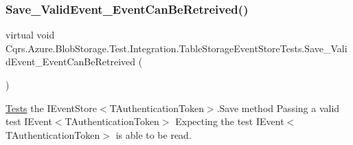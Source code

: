 \subsubsection{\texorpdfstring{Save\+\_\+\+Valid\+Event\+\_\+\+Event\+Can\+Be\+Retreived()}{Save\_ValidEvent\_EventCanBeRetreived()}}
{\footnotesize\ttfamily virtual void Cqrs.\+Azure.\+Blob\+Storage.\+Test.\+Integration.\+Table\+Storage\+Event\+Store\+Tests.\+Save\+\_\+\+Valid\+Event\+\_\+\+Event\+Can\+Be\+Retreived (\begin{DoxyParamCaption}{ }\end{DoxyParamCaption})\hspace{0.3cm}{\ttfamily [virtual]}}



\hyperlink{namespaceCqrs_1_1Tests}{Tests} the I\+Event\+Store$<$\+T\+Authentication\+Token$>$.\+Save method Passing a valid test I\+Event$<$\+T\+Authentication\+Token$>$ Expecting the test I\+Event$<$\+T\+Authentication\+Token$>$ is able to be read. 

